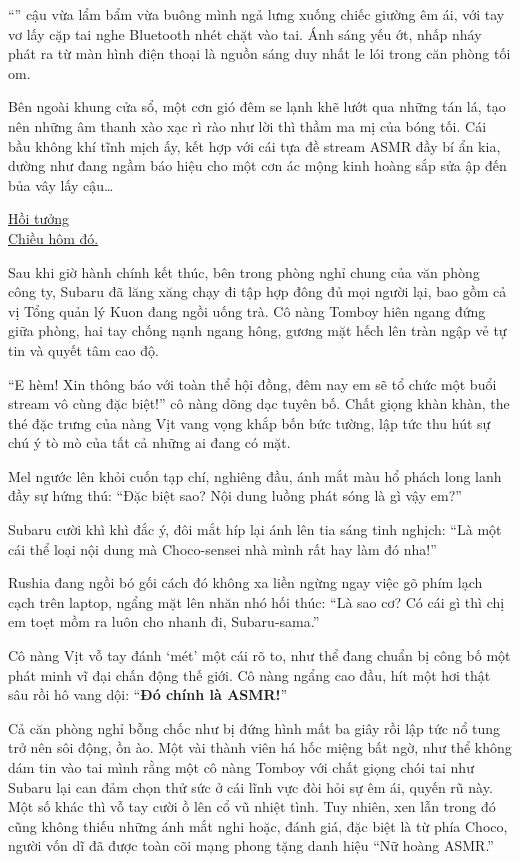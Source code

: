 \documentclass[../main.tex]{subfiles}
\begin{document}
``'' cậu vừa lẩm bẩm vừa buông mình ngả lưng xuống chiếc giường êm ái, với tay vơ lấy cặp tai nghe Bluetooth nhét chặt vào tai. Ánh sáng yếu ớt, nhấp nháy phát ra từ màn hình điện thoại là nguồn sáng duy nhất le lói trong căn phòng tối om.

Bên ngoài khung cửa sổ, một cơn gió đêm se lạnh khẽ lướt qua những tán lá, tạo nên những âm thanh xào xạc rì rào như lời thì thầm ma mị của bóng tối. Cái bầu không khí tĩnh mịch ấy, kết hợp với cái tựa đề stream ASMR đầy bí ẩn kia, dường như đang ngầm báo hiệu cho một cơn ác mộng kinh hoàng sắp sửa ập đến bủa vây lấy cậu\dots

\begin{center}
  \uline{Hồi tưởng\\Chiều hôm đó.}
\end{center}

Sau khi giờ hành chính kết thúc, bên trong phòng nghỉ chung của văn phòng công ty, Subaru đã lăng xăng chạy đi tập hợp đông đủ mọi người lại, bao gồm cả vị Tổng quản lý Kuon đang ngồi uống trà. Cô nàng Tomboy hiên ngang đứng giữa phòng, hai tay chống nạnh ngang hông, gương mặt hếch lên tràn ngập vẻ tự tin và quyết tâm cao độ.

``E hèm! Xin thông báo với toàn thể hội đồng, đêm nay em sẽ tổ chức một buổi stream vô cùng đặc biệt!'' cô nàng dõng dạc tuyên bố. Chất giọng khàn khàn, the thé đặc trưng của nàng Vịt vang vọng khắp bốn bức tường, lập tức thu hút sự chú ý tò mò của tất cả những ai đang có mặt.

Mel ngước lên khỏi cuốn tạp chí, nghiêng đầu, ánh mắt màu hổ phách long lanh đầy sự hứng thú: ``Đặc biệt sao? Nội dung luồng phát sóng là gì vậy em?''

Subaru cười khì khì đắc ý, đôi mắt híp lại ánh lên tia sáng tinh nghịch: ``Là một cái thể loại nội dung mà Choco-sensei nhà mình rất hay làm đó nha!''

Rushia đang ngồi bó gối cách đó không xa liền ngừng ngay việc gõ phím lạch cạch trên laptop, ngẩng mặt lên nhăn nhó hối thúc: ``Là sao cơ? Có cái gì thì chị em toẹt mồm ra luôn cho nhanh đi, Subaru-sama.''

Cô nàng Vịt vỗ tay đánh `mét' một cái rõ to, như thể đang chuẩn bị công bố một phát minh vĩ đại chấn động thế giới. Cô nàng ngẩng cao đầu, hít một hơi thật sâu rồi hô vang dội: ``\textbf{Đó chính là ASMR!}''

Cả căn phòng nghỉ bỗng chốc như bị đứng hình mất ba giây rồi lập tức nổ tung trở nên sôi động, ồn ào. Một vài thành viên há hốc miệng bất ngờ, như thể không dám tin vào tai mình rằng một cô nàng Tomboy với chất giọng chói tai như Subaru lại can đảm chọn thử sức ở cái lĩnh vực đòi hỏi sự êm ái, quyến rũ này. Một số khác thì vỗ tay cười ồ lên cổ vũ nhiệt tình. Tuy nhiên, xen lẫn trong đó cũng không thiếu những ánh mắt nghi hoặc, đánh giá, đặc biệt là từ phía Choco, người vốn dĩ đã được toàn cõi mạng phong tặng danh hiệu ``Nữ hoàng ASMR.''
\end{document}
